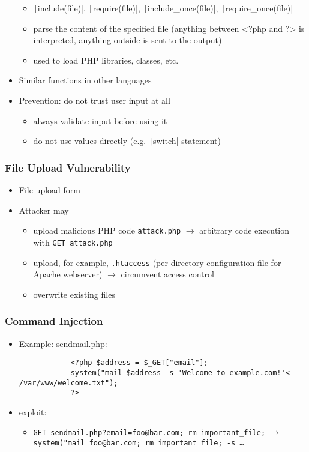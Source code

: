\documentclass[final]{article}
\begin{document}
\begin{itemize}[nosep]
          \begin{itemize}
              \item \texttt|include(file)|, \texttt|require(file)|, \texttt|include_once(file)|, \texttt|require_once(file)|
              \item parse the content of the specified file (anything between <?php and ?> is interpreted, anything outside is sent to the output)
              \item used to load PHP libraries, classes, etc.
          \end{itemize}
    \item Similar functions in other languages
    \item Prevention: do not trust user input at all
          \begin{itemize}[nosep]
              \item always validate input before using it
              \item do not use values directly (e.g. \texttt|switch| statement)
          \end{itemize}
\end{itemize}
\subsubsection*{File Upload Vulnerability}
\begin{itemize}
    \item File upload form
    \item Attacker may
          \begin{itemize}
              \item upload malicious PHP code \texttt{attack.php} $\rightarrow$ arbitrary code execution with \texttt{GET attack.php}
              \item upload, for example, \texttt{.htaccess} (per-directory configuration file for Apache webserver) $\rightarrow$ circumvent access control
              \item overwrite existing files
          \end{itemize}
\end{itemize}
\subsubsection*{Command Injection}
\begin{itemize}[nosep]
    \item Example: sendmail.php:
          \begin{verbatim}
            <?php $address = $_GET["email"];
            system("mail $address -s 'Welcome to example.com!'< /var/www/welcome.txt");
            ?>
        \end{verbatim}
    \item exploit:
          \begin{itemize}[nosep]
              \item \texttt{GET sendmail.php?email=foo@bar.com; rm important\_file;} $\rightarrow$ \texttt{system("mail foo@bar.com; rm important\_file; -s \dots}
          \end{itemize}
\end{itemize}
\end{document}

